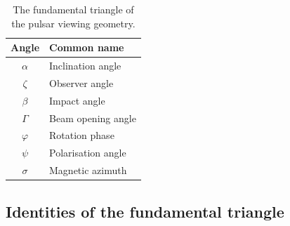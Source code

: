 \documentclass{book}
\newcommand{\phase}{\varphi}
\begin{document}
\begin{table}[!ht]
    \centering
    \caption{The fundamental triangle of the pulsar viewing geometry.}
    \label{tbl:pulsarangles}
    \begin{tabular}{c|l}
        \hline
        Angle & Common name \\
        \hline
        $\alpha$ & Inclination angle \\
        $\zeta$  & Observer angle \\
        $\beta$  & Impact angle \\
        $\Gamma$ & Beam opening angle \\
        $\phase$ & Rotation phase \\
        $\psi$   & Polarisation angle \\
        $\sigma$ & Magnetic azimuth \\
        \hline
    \end{tabular}
\end{table}

\subsection{Identities of the fundamental triangle}
\end{document}
